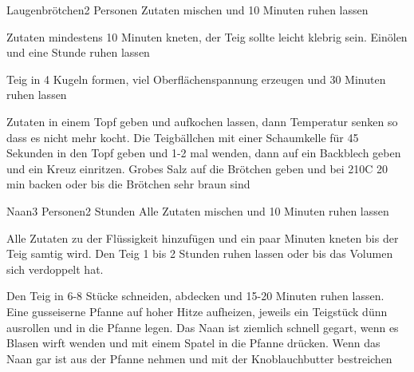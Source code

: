 
\begin{recipe}{Laugenbrötchen}{}{2 Personen}
Zutaten mischen und 10 Minuten ruhen lassen

Zutaten mindestens 10 Minuten kneten, der Teig sollte leicht klebrig sein.
Einölen und eine Stunde ruhen lassen

\ing[]{}{}
Teig in 4 Kugeln formen, viel Oberflächenspannung erzeugen und 30 Minuten ruhen lassen

Zutaten in einem Topf geben und aufkochen lassen, dann Temperatur senken so dass es nicht mehr kocht. Die Teigbällchen mit einer Schaumkelle für 45 Sekunden in den Topf geben und 1-2 mal wenden, dann auf ein Backblech geben und ein Kreuz einritzen.
Grobes Salz auf die Brötchen geben und bei 210\0C 20 min backen oder bis die Brötchen sehr braun sind 
\end{recipe}


\begin{recipe}{Naan}{3 Personen}{2 Stunden}
Alle Zutaten mischen und 10 Minuten ruhen lassen

Alle Zutaten zu der Flüssigkeit hinzufügen und ein paar Minuten kneten bis der Teig samtig wird. Den Teig 1 bis 2 Stunden ruhen lassen oder bis das Volumen sich verdoppelt hat.

Den Teig in 6-8 Stücke schneiden, abdecken und 15-20 Minuten ruhen lassen.
Eine gusseiserne Pfanne auf hoher Hitze aufheizen, jeweils ein Teigstück dünn ausrollen und in die Pfanne legen.
Das Naan ist ziemlich schnell gegart, wenn es Blasen wirft wenden und mit einem Spatel in die Pfanne drücken.
Wenn das Naan gar ist aus der Pfanne nehmen und mit der Knoblauchbutter bestreichen
\end{recipe}


